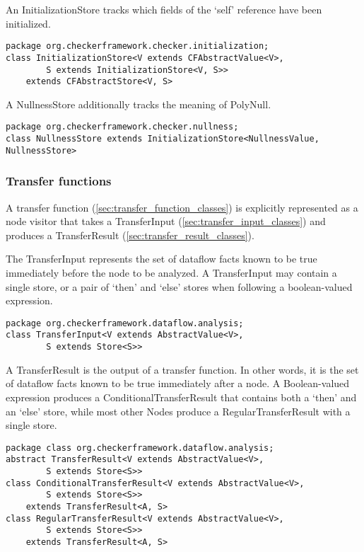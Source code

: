 An InitializationStore tracks which fields of the `self' reference
have been initialized.

\begin{verbatim}
package org.checkerframework.checker.initialization;
class InitializationStore<V extends CFAbstractValue<V>,
        S extends InitializationStore<V, S>>
    extends CFAbstractStore<V, S>
\end{verbatim}

A NullnessStore additionally tracks the meaning of PolyNull.

\begin{verbatim}
package org.checkerframework.checker.nullness;
class NullnessStore extends InitializationStore<NullnessValue, NullnessStore>
\end{verbatim}


\subsubsection{Transfer functions}
\label{sec:transfer_functions}

A transfer function (\autoref{sec:transfer_function_classes}) is
explicitly represented as a node visitor that takes a TransferInput
(\autoref{sec:transfer_input_classes}) and produces a TransferResult
(\autoref{sec:transfer_result_classes}).

\label{sec:transfer_input_classes}

The TransferInput represents the set of dataflow facts known to be
true immediately before the node to be analyzed.  A TransferInput may
contain a single store, or a pair of `then' and `else' stores when
following a boolean-valued expression.

\begin{verbatim}
package org.checkerframework.dataflow.analysis;
class TransferInput<V extends AbstractValue<V>,
        S extends Store<S>>
\end{verbatim}

\label{sec:transfer_result_classes}

A TransferResult is the output of a transfer function.  In other
words, it is the set of dataflow facts known to be true immediately
after a node.  A Boolean-valued expression produces a
ConditionalTransferResult that contains both a `then' and an `else'
store, while most other Nodes produce a RegularTransferResult with a
single store.

\begin{verbatim}
package class org.checkerframework.dataflow.analysis;
abstract TransferResult<V extends AbstractValue<V>,
        S extends Store<S>>
class ConditionalTransferResult<V extends AbstractValue<V>,
        S extends Store<S>>
    extends TransferResult<A, S>
class RegularTransferResult<V extends AbstractValue<V>,
        S extends Store<S>>
    extends TransferResult<A, S>
\end{verbatim}

